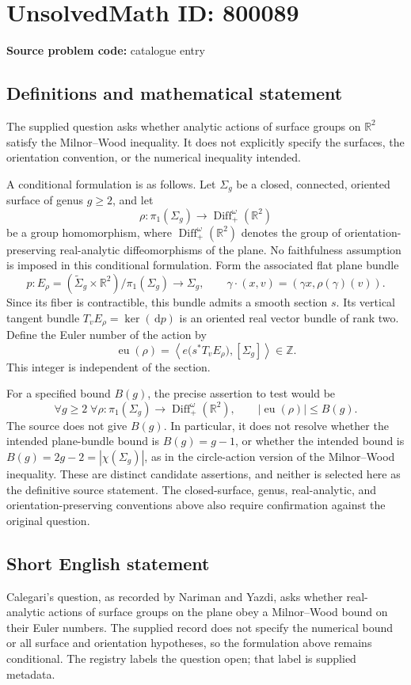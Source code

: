 \documentclass[11pt]{article}
\newcommand{\Z}{\mathbb{Z}}
\newcommand{\R}{\mathbb{R}}
\newcommand{\dd}{\,\mathrm{d}}
\begin{document}
\section*{UnsolvedMath ID: 800089}
\textbf{Source problem code:} catalogue entry
\subsection{Definitions and mathematical statement}
The supplied question asks whether analytic actions of surface groups on \(\R^2\) satisfy the Milnor--Wood inequality. It does not explicitly specify the surfaces, the orientation convention, or the numerical inequality intended.

A conditional formulation is as follows. Let \(\Sigma_g\) be a closed, connected, oriented surface of genus \(g\geq 2\), and let
\[
\rho\colon\pi_1(\Sigma_g)\longrightarrow\operatorname{Diff}^{\omega}_{+}(\R^2)
\]
be a group homomorphism, where \(\operatorname{Diff}^{\omega}_{+}(\R^2)\) denotes the group of orientation-preserving real-analytic diffeomorphisms of the plane. No faithfulness assumption is imposed in this conditional formulation. Form the associated flat plane bundle
\[
p\colon E_\rho=(\widetilde{\Sigma}_g\times\R^2)/\pi_1(\Sigma_g)\longrightarrow\Sigma_g,
\qquad
\gamma\cdot(x,v)=(\gamma x,\rho(\gamma)(v)).
\]
Since its fiber is contractible, this bundle admits a smooth section \(s\). Its vertical tangent bundle \(T_vE_\rho=\ker(\dd p)\) is an oriented real vector bundle of rank two. Define the Euler number of the action by
\[
\operatorname{eu}(\rho)=\left\langle e\bigl(s^*T_vE_\rho\bigr),[\Sigma_g]\right\rangle\in\Z.
\]
This integer is independent of the section.

For a specified bound \(B(g)\), the precise assertion to test would be
\[
\forall g\geq 2\;\forall\rho\colon\pi_1(\Sigma_g)\to\operatorname{Diff}^{\omega}_{+}(\R^2),
\qquad |\operatorname{eu}(\rho)|\leq B(g).
\]
The source does not give \(B(g)\). In particular, it does not resolve whether the intended plane-bundle bound is \(B(g)=g-1\), or whether the intended bound is \(B(g)=2g-2=|\chi(\Sigma_g)|\), as in the circle-action version of the Milnor--Wood inequality. These are distinct candidate assertions, and neither is selected here as the definitive source statement. The closed-surface, genus, real-analytic, and orientation-preserving conventions above also require confirmation against the original question.
\subsection{Short English statement}
Calegari's question, as recorded by Nariman and Yazdi, asks whether real-analytic actions of surface groups on the plane obey a Milnor--Wood bound on their Euler numbers. The supplied record does not specify the numerical bound or all surface and orientation hypotheses, so the formulation above remains conditional. The registry labels the question open; that label is supplied metadata.
\end{document}
